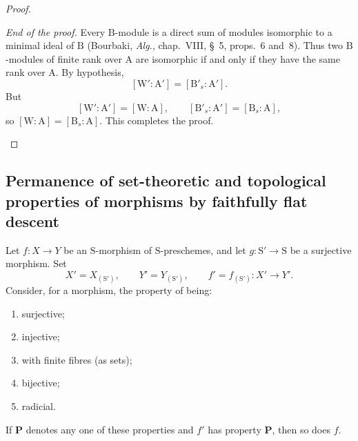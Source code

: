 \begin{proof}
\begin{env}[2.5.8.9]
\label{IV.2.5.8.9}
\emph{End of the proof.} Every $\mathrm{B}$-module is a direct sum of
modules isomorphic to a minimal ideal of $\mathrm{B}$ (Bourbaki,
\emph{Alg.}, chap.~VIII, \S~5, props.~6 and~8). Thus two
$\mathrm{B}$-modules of finite rank over $\mathrm{A}$ are isomorphic
if and only if they have the same rank over $\mathrm{A}$. By hypothesis,
\[
  [\mathrm{W}':\mathrm{A}']=[\mathrm{B}'_s:\mathrm{A}'].
\]
But
\[
  [\mathrm{W}':\mathrm{A}']=[\mathrm{W}:\mathrm{A}],
  \qquad
  [\mathrm{B}'_s:\mathrm{A}']=[\mathrm{B}_s:\mathrm{A}],
\]
so $[\mathrm{W}:\mathrm{A}]=[\mathrm{B}_s:\mathrm{A}]$. This completes
the proof.
\end{env}
\end{proof}


\subsection{Permanence of set-theoretic and topological properties of morphisms
by faithfully flat descent}
\label{subsection:IV.2.6}

\begin{proposition}[2.6.1]
\label{IV.2.6.1}
Let $f:X\to Y$ be an $\mathrm{S}$-morphism of $\mathrm{S}$-preschemes,
and let $g:\mathrm{S}'\to\mathrm{S}$ be a surjective morphism. Set
\[
  X'=X_{(\mathrm{S}')},\qquad
  Y'=Y_{(\mathrm{S}')},\qquad
  f'=f_{(\mathrm{S}')}:X'\to Y'.
\]
Consider, for a morphism, the property of being:
\begin{enumerate}
  \item[(i)] surjective;
  \item[(ii)] injective;
  \item[(iii)] with finite fibres \textnormal{(}as sets\textnormal{)};
  \item[(iv)] bijective;
  \item[(v)] radicial.
\end{enumerate}
If $\mathbf{P}$ denotes any one of these properties and $f'$ has
property $\mathbf{P}$, then so does $f$.
\end{proposition}

